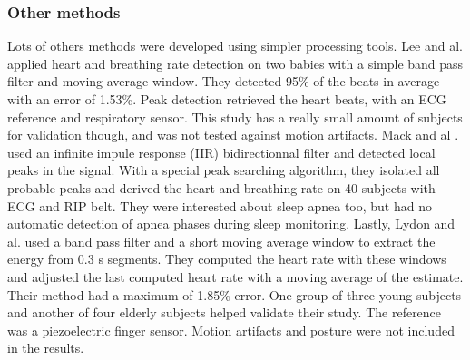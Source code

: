 \documentclass[twoside,onecolumn]{article}
\begin{document}
\subsubsection{Other methods}
Lots of others methods were developed using simpler processing tools. Lee and al. \cite{lee_ballistocardiogram_2015} applied heart and breathing rate detection on two babies with a simple band pass filter and moving average window. They detected 95\% of the beats in average with an error of 1.53\%. Peak detection retrieved the heart beats, with an ECG reference and respiratory sensor. This study has a really small amount of subjects for validation though, and was not tested against motion artifacts. Mack and al .\cite{mack_development_2009} used an infinite impule response (IIR) bidirectionnal filter and detected local peaks in the signal. With a special peak searching algorithm, they isolated all probable peaks and derived the heart and breathing rate on 40 subjects with ECG and RIP belt. They were interested about sleep apnea too, but had no automatic detection of apnea phases during sleep monitoring. Lastly, Lydon and al. \cite{lydon_robust_2015} used a band pass filter and a short moving average window to extract the energy from 0.3 s segments. They computed the heart rate with these windows and adjusted the last computed heart rate with a moving average of the estimate. Their method had a maximum of 1.85\% error. One group of three young subjects and another of four elderly subjects helped validate their study. The reference was a piezoelectric finger sensor. Motion artifacts and posture were not included in the results.
\end{document}

